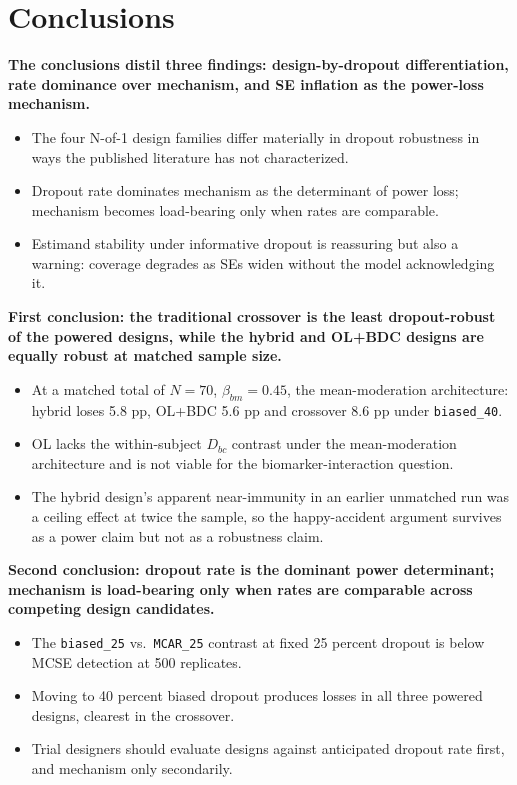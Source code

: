 \documentclass[
  11pt,
]{article}
\begin{document}
\section{Conclusions}\label{conclusions}

\textbf{The conclusions distil three findings: design-by-dropout differentiation, rate dominance over mechanism, and SE inflation as the power-loss mechanism.}

\begin{itemize}\setlength{\itemsep}{2pt}\setlength{\parskip}{0pt}
\item The four N-of-1 design families differ materially in dropout robustness in ways the published literature has not characterized.
\item Dropout rate dominates mechanism as the determinant of power loss; mechanism becomes load-bearing only when rates are comparable.
\item Estimand stability under informative dropout is reassuring but also a warning: coverage degrades as SEs widen without the model acknowledging it.
\end{itemize}

\textbf{First conclusion: the traditional crossover is the least dropout-robust of the powered designs, while the hybrid and OL+BDC designs are equally robust at matched sample size.}

\begin{itemize}\setlength{\itemsep}{2pt}\setlength{\parskip}{0pt}
\item At a matched total of $N = 70$, $\beta_{bm}=0.45$, the mean-moderation architecture: hybrid loses 5.8 pp, OL+BDC 5.6 pp and crossover 8.6 pp under \texttt{biased\_40}.
\item OL lacks the within-subject $D_{bc}$ contrast under the mean-moderation architecture and is not viable for the biomarker-interaction question.
\item The hybrid design's apparent near-immunity in an earlier unmatched run was a ceiling effect at twice the sample, so the happy-accident argument survives as a power claim but not as a robustness claim.
\end{itemize}

\textbf{Second conclusion: dropout rate is the dominant power determinant; mechanism is load-bearing only when rates are comparable across competing design candidates.}

\begin{itemize}\setlength{\itemsep}{2pt}\setlength{\parskip}{0pt}
\item The \texttt{biased\_25} vs.\ \texttt{MCAR\_25} contrast at fixed 25 percent dropout is below MCSE detection at 500 replicates.
\item Moving to 40 percent biased dropout produces losses in all three powered designs, clearest in the crossover.
\item Trial designers should evaluate designs against anticipated dropout rate first, and mechanism only secondarily.
\end{itemize}
\end{document}
